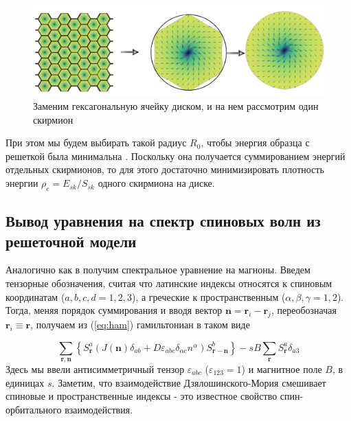 \documentclass[a4paper,article,14pt]{extarticle}
\begin{document}
\begin{figure}[h]
\centering
\includegraphics[width=0.5\paperwidth]{images/approx.png}
\caption{Заменим гексагональную ячейку диском, и на нем рассмотрим один скирмион}
\label{pic:approxHexagone}
\end{figure}

При этом мы будем выбирать такой радиус $R_0$, чтобы энергия образца с решеткой была минимальна \cite{paper:bogdanov, paper:nagaosaHan}. Поскольку она получается суммированием энергий отдельных скирмионов, то для этого достаточно минимизировать плотность энергии $\rho_{c} = E_{sk}/S_{sk}$ одного скирмиона на диске.



\subsection{Вывод уравнения на спектр спиновых волн из решеточной модели}
Аналогично как в \cite{paper:aristov} получим спектральное уравнение на магноны. Введем тензорные обозначения, считая что латинские индексы относятся к спиновым координатам ($a,b,c,d = 1,2,3$), а греческие к пространственным ($\alpha, \beta, \gamma = 1,2$). Тогда, меняя порядок суммирования и вводя вектор $\mathbf{n}=\mathbf{r}_i - \mathbf{r}_j$, переобозначая $\mathbf{r}_i \equiv \mathbf{r}$, получаем из (\ref{eq:ham}) гамильтониан в таком виде

\begin{equation}
\label{eq:mainHam}
\sum\limits_{{\mathbf{r}},{\mathbf{n}}} {\left\{ {S_{\mathbf{r}}^a\left( {J\left( {\mathbf{n}} \right){\delta _{ab}} + D{\varepsilon _{abc}}{\delta _{\alpha c}}{n^\alpha }} \right)S_{{\mathbf{r}} - {\mathbf{n}}}^b} \right\}}  - sB\sum\limits_{\mathbf{r}} {S_{\mathbf{r}}^a{\delta _{a3}}}
\end{equation}
Здесь мы ввели антисимметричный тензор $\varepsilon_{abc}$ ($\varepsilon_{123} = 1$) и магнитное поле $B$, в единицах $s$. Заметим, что взаимодействие Дзялошинского-Мория смешивает спиновые и пространственные индексы - это известное свойство спин-орбитального взаимодействия.
\end{document}
